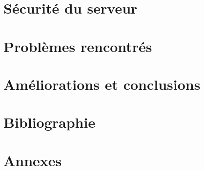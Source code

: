 \documentclass[a4paper, 12pt]{article}
\begin{document}
	\section{Sécurité du serveur}
	
	\section{Problèmes rencontrés}
	
	\section{Améliorations et conclusions}
	
	\section{Bibliographie}
	
	\section{Annexes}
\end{document}
